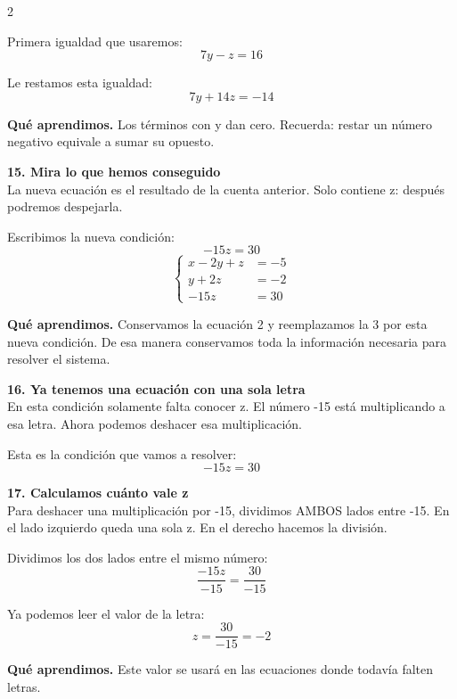 \documentclass[11pt,a4paper,landscape]{article}
\begin{document}
\begin{multicols*}{2}
\begin{minipage}{\linewidth}
\par\smallskip Primera igualdad que usaremos:
\[7y - z = 16\]
\par\smallskip Le restamos esta igualdad:
\[7y + 14z = -14\]
\par\smallskip\textbf{Qué aprendimos.} Los términos con y dan cero. Recuerda: restar un número negativo equivale a sumar su opuesto.
\end{minipage}\par\medskip
\noindent\begin{minipage}{\linewidth}\textbf{15. Mira lo que hemos conseguido}\\[2pt]La nueva ecuación es el resultado de la cuenta anterior. Solo contiene z: después podremos despejarla.
\par\smallskip Escribimos la nueva condición:
\[-15z = 30\]
\[\left\{\begin{aligned}x - 2y + z &= -5\\y + 2z &= -2\\-15z &= 30\end{aligned}\right.\]
\par\smallskip\textbf{Qué aprendimos.} Conservamos la ecuación 2 y reemplazamos la 3 por esta nueva condición. De esa manera conservamos toda la información necesaria para resolver el sistema.
\end{minipage}\par\medskip
\noindent\begin{minipage}{\linewidth}\textbf{16. Ya tenemos una ecuación con una sola letra}\\[2pt]En esta condición solamente falta conocer z. El número -15 está multiplicando a esa letra. Ahora podemos deshacer esa multiplicación.
\par\smallskip Esta es la condición que vamos a resolver:
\[-15z = 30\]
\end{minipage}\par\medskip
\noindent\begin{minipage}{\linewidth}\textbf{17. Calculamos cuánto vale z}\\[2pt]Para deshacer una multiplicación por -15, dividimos AMBOS lados entre -15. En el lado izquierdo queda una sola z. En el derecho hacemos la división.
\par\smallskip Dividimos los dos lados entre el mismo número:
\[\frac{-15z}{-15}=\frac{30}{-15}\]
\par\smallskip Ya podemos leer el valor de la letra:
\[z=\frac{30}{-15}=-2\]
\par\smallskip\textbf{Qué aprendimos.} Este valor se usará en las ecuaciones donde todavía falten letras.

\end{minipage}
\end{multicols*}
\end{document}
